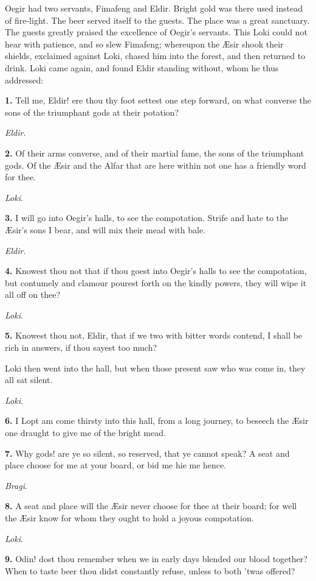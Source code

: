 Oegir had two servants, Fimafeng and Eldir. Bright gold was there used
instead of fire-light. The beer served itself to the guests. The place
was a great sanctuary. The guests greatly praised the excellence of
Oegir's servants. This Loki could not hear with patience, and so slew
Fimafeng; whereupon the Æsir shook their shields, exclaimed against
Loki, chased him into the forest, and then returned to drink. Loki
came again, and found Eldir standing without, whom he thus addressed:

\textbf{1.} Tell me, Eldir! ere thou thy foot settest one step forward, on
what converse the sons of the triumphant gods at their potation?

\emph{Eldir}.

\textbf{2.} Of their arms converse, and of their martial fame, the sons of
the triumphant gods. Of the Æsir and the Alfar that are here within
not one has a friendly word for thee.

\emph{Loki}.

\textbf{3.} I will go into Oegir's halls, to see the compotation. Strife and
hate to the Æsir's sons I bear, and will mix their mead with bale.

\emph{Eldir}.

\textbf{4.} Knowest thou not that if thou goest into Oegir's halls to see the
compotation, but contumely and clamour pourest forth on the kindly
powers, they will wipe it all off on thee?

\emph{Loki}.

\textbf{5.} Knowest thou not, Eldir, that if we two with bitter words
contend, I shall be rich in answers, if thou sayest too much?

Loki then went into the hall, but when those present saw who was come
in, they all sat silent.

\emph{Loki}.

\textbf{6.} I Lopt am come thirsty into this hall, from a long journey, to
beseech the Æsir one draught to give me of the bright mead.

\textbf{7.} Why gods! are ye so silent, so reserved, that ye cannot speak? A
seat and place choose for me at your board, or bid me hie me hence.

\emph{Bragi}.

\textbf{8.} A seat and place will the Æsir never choose for thee at their
board; for well the Æsir know for whom they ought to hold a joyous
compotation.

\emph{Loki}.

\textbf{9.} Odin! dost thou remember when we in early days blended our blood
together? When to taste beer thou didst constantly refuse, unless to
both 'twas offered?

